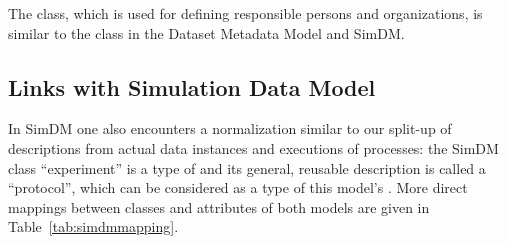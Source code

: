 The  class, which is used for defining responsible persons and 
organizations, is similar to the  class in the Dataset Metadata Model and SimDM.

\subsection{Links with Simulation Data Model}
In SimDM one also encounters a normalization similar to our split-up of descriptions from 
actual data instances and executions of processes: the SimDM class ``experiment'' 
is a type of  and its general, reusable description is called a ``protocol'',
which can be considered as a type of this model's . 
More direct mappings between classes and attributes of both models are given in Table~\ref{tab:simdmmapping}.

